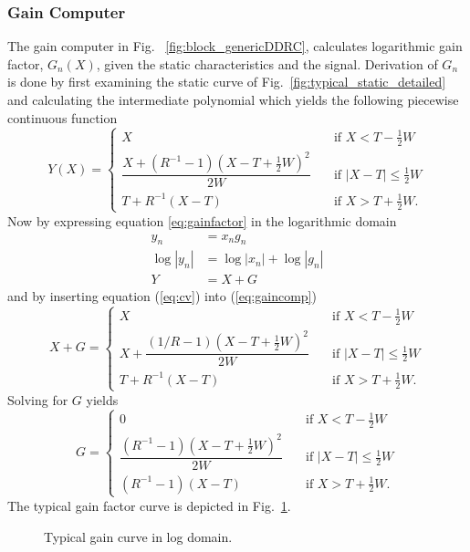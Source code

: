 \documentclass[../main2.tex]{subfiles}
\providecommand{\rootdir}{..}
\begin{document}
\subsubsection{Gain Computer} \label{gain_computer}
The gain computer in Fig. ~\ref{fig:block_genericDDRC}, calculates logarithmic gain factor, $G_n(X)$, given the static characteristics and the signal. Derivation of $G_n$ is done by first examining the static curve of Fig.~\ref{fig:typical_static_detailed} and calculating the intermediate polynomial which yields the following piecewise continuous function
\begin{equation} \label{eq:gaincomp}
Y(X) = \begin{cases}
    X & \quad \text{if }X<T-\frac{1}{2}W \\[0.8em]
    \dfrac{X+(R^{-1}-1)(X-T+\frac{1}{2}W)^2}{2W}& \quad \text{if } |X-T| \leq \frac{1}{2}W\\[1.2em]
    T+ R^{-1}(X-T) & \quad \text{if } X > T + \frac{1}{2}W.
\end{cases}
\end{equation}
Now  by expressing equation \eqref{eq:gainfactor} in the logarithmic domain
\begin{align}
y_n &= x_ng_n   \\
\log|y_n| & = \log|x_n| + \log|g_n|   \\
Y &= X + G \label{eq:cv}
\end{align}
and by inserting equation (\ref{eq:cv}) into (\ref{eq:gaincomp})
\begin{equation}
X+G = \begin{cases}
    X & \quad \text{if }X < T-\frac{1}{2}W \\[0.8em]
    X + \dfrac{(1/R-1)(X-T+\frac{1}{2}W)^2}{2W}& \quad \text{if } |X-T| \leq \frac{1}{2}W\\[1.2em]
    T+ R^{-1}(X-T) & \quad \text{if } X > T + \frac{1}{2}W.
\end{cases}
\end{equation}
Solving for $G$ yields
\begin{equation} \label{eq:c}
G = \begin{cases}
    0 & \quad \text{if }X <T -\frac{1}{2}W \\[0.8em]
    \dfrac{(R^{-1}-1)(X-T+\frac{1}{2}W)^2}{2W}& \quad \text{if } |X-T| \leq \frac{1}{2}W\\[1.2em]
    \left(R^{-1}-1\right)\left(X-T\right) & \quad \text{if } X > T + \frac{1}{2}W.
 \end{cases}
\end{equation}
The typical gain factor curve is depicted in Fig.~\ref{fig:typical_gain_detailed}.
\begin{figure}[h]
\centerline{}
\caption{Typical gain curve in log domain.}
\label{fig:typical_gain_detailed}
\end{figure}
\end{document}
